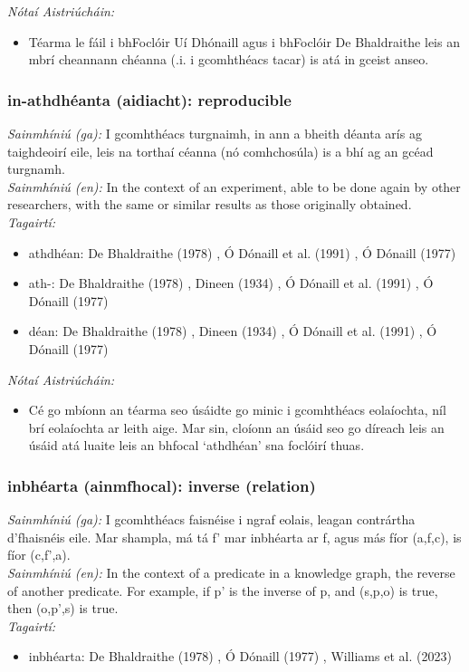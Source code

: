 \documentclass{article}
\begin{document}
 \noindent \textit{Nótaí Aistriúcháin:}
\begin{itemize}
	\item Téarma le fáil i bhFoclóir Uí Dhónaill agus i bhFoclóir De Bhaldraithe leis an mbrí cheannann chéanna (.i. i gcomhthéacs tacar) is atá in gceist anseo.
\end{itemize}


\subsubsection*{in-athdhéanta (aidiacht): reproducible}
 \noindent \textit{Sainmhíniú (ga):} I gcomhthéacs turgnaimh, in ann a bheith déanta arís ag taighdeoirí eile, leis na torthaí céanna (nó comhchosúla) is a bhí ag an gcéad turgnamh.
\\
 \noindent \textit{Sainmhíniú (en):} In the context of an experiment, able to be done again by other researchers, with the same or similar results as those originally obtained.
\\
 \noindent \textit{Tagairtí:}
\begin{itemize}
	\item athdhéan: De Bhaldraithe (1978) \cite{de-bhaldraithe}, Ó Dónaill et al. (1991) \cite{focloir-beag}, Ó Dónaill (1977) \cite{odonaill}
	\item ath-: De Bhaldraithe (1978) \cite{de-bhaldraithe}, Dineen (1934) \cite{dineen}, Ó Dónaill et al. (1991) \cite{focloir-beag}, Ó Dónaill (1977) \cite{odonaill}
	\item déan: De Bhaldraithe (1978) \cite{de-bhaldraithe}, Dineen (1934) \cite{dineen}, Ó Dónaill et al. (1991) \cite{focloir-beag}, Ó Dónaill (1977) \cite{odonaill}
\end{itemize}

 \noindent \textit{Nótaí Aistriúcháin:}
\begin{itemize}
	\item Cé go mbíonn an téarma seo úsáidte go minic i gcomhthéacs eolaíochta, níl brí eolaíochta ar leith aige. Mar sin, cloíonn an úsáid seo go díreach leis an úsáid atá luaite leis an bhfocal `athdhéan' sna foclóirí thuas.
\end{itemize}


\subsubsection*{inbhéarta (ainmfhocal): inverse (relation)}
 \noindent \textit{Sainmhíniú (ga):} I gcomhthéacs faisnéise i ngraf eolais, leagan contrártha d'fhaisnéis eile. Mar shampla, má tá f' mar inbhéarta ar f, agus más fíor (a,f,c), is fíor (c,f',a).
\\
 \noindent \textit{Sainmhíniú (en):} In the context of a predicate in a knowledge graph, the reverse of another predicate. For example, if p' is the inverse of p, and (s,p,o) is true, then (o,p',s) is true.
\\
 \noindent \textit{Tagairtí:}
\begin{itemize}
	\item inbhéarta: De Bhaldraithe (1978) \cite{de-bhaldraithe}, Ó Dónaill (1977) \cite{odonaill}, Williams et al. (2023) \cite{storchiste}
\end{itemize}
\end{document}
